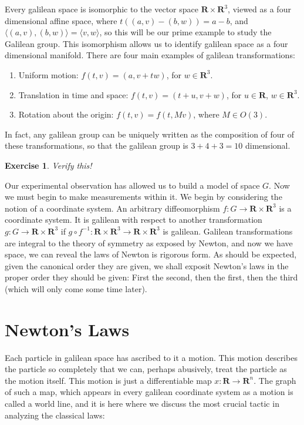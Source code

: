 \documentclass{article}
\newtheorem{exercise}{Exercise}
\begin{document}
Every galilean space is isomorphic to the vector space $\mathbf{R} \times \mathbf{R}^3$, viewed as a four dimensional affine space, where $t((a,v) - (b,w)) = a - b$, and $\langle (a,v), (b,w) \rangle = \langle v, w \rangle$, so this will be our prime example to study the Galilean group. This isomorphism allows us to identify galilean space as a four dimensional manifold. There are four main examples of galilean transformations:
%
\begin{enumerate}
    \item Uniform motion: $f(t,v) = (a,v + tw)$, for $w \in \mathbf{R}^3$.
    \item Translation in time and space: $f(t,v) = (t + u, v + w)$, for $u \in \mathbf{R}$, $w \in \mathbf{R}^3$.
    \item Rotation about the origin: $f(t,v) = f(t,Mv)$, where $M \in O(3)$.
\end{enumerate}
%
In fact, any galilean group can be uniquely written as the composition of four of these transformations, so that the galilean group is $3 + 4 + 3 = 10$ dimensional.

\begin{exercise}
    Verify this!
\end{exercise}

Our experimental observation has allowed us to build a model of space $G$. Now we must begin to make measurements within it. We begin by considering the notion of a coordinate system. An arbitrary diffeomorphism $f:G \to \mathbf{R} \times \mathbf{R}^3$ is a coordinate system. It is galilean with respect to another transformation $g:G \to \mathbf{R} \times \mathbf{R}^3$ if $g \circ f^{-1}: \mathbf{R} \times \mathbf{R}^3 \to \mathbf{R} \times \mathbf{R}^3$ is galilean. Galilean transformations are integral to the theory of symmetry as exposed by Newton, and now we have space, we can reveal the laws of Newton is rigorous form. As should be expected, given the canonical order they are given, we shall exposit Newton's laws in the proper order they should be given: First the second, then the first, then the third (which will only come some time later).

\section{Newton's Laws}

Each particle in galilean space has ascribed to it a motion. This motion describes the particle so completely that we can, perhaps abusively, treat the particle as the motion itself. This motion is just a differentiable map $x:\mathbf{R} \to \mathbf{R}^n$. The graph of such a map, which appears in every galilean coordinate system as a motion is called a world line, and it is here where we discuss the most crucial tactic in analyzing the classical laws:
\end{document}
